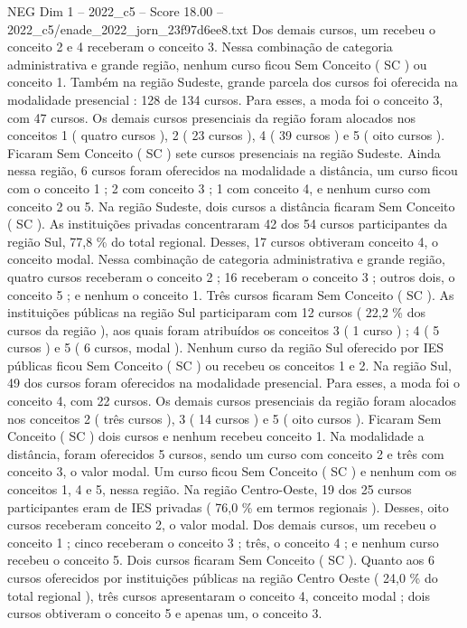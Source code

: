 \begin{textsample}{NEG Dim 1 – 2022\_c5 – Score 18.00 – 2022\_c5/enade\_2022\_jorn\_23f97d6ee8.txt}
Dos demais cursos, um recebeu o conceito 2 e 4 receberam o conceito 3.
Nessa combinação de categoria administrativa e grande região, nenhum curso ficou Sem Conceito ( SC ) ou conceito 1.
Também na região Sudeste, grande parcela dos cursos foi oferecida na modalidade presencial : 128 de 134 cursos.
Para esses, a moda foi o conceito 3, com 47 cursos.
Os demais cursos presenciais da região foram alocados nos conceitos 1 ( quatro cursos ), 2 ( 23 cursos ), 4 ( 39 cursos ) e 5 ( oito cursos ).
Ficaram Sem Conceito ( SC ) sete cursos presenciais na região Sudeste.
Ainda nessa região, 6 cursos foram oferecidos na modalidade a distância, um curso ficou com o conceito 1 ; 2 com conceito 3 ; 1 com conceito 4, e nenhum curso com conceito 2 ou 5.
Na região Sudeste, dois cursos a distância ficaram Sem Conceito ( SC ).
As instituições privadas concentraram 42 dos 54 cursos participantes da região Sul, 77,8 \% do total regional.
Desses, 17 cursos obtiveram conceito 4, o conceito modal.
Nessa combinação de categoria administrativa e grande região, quatro cursos receberam o conceito 2 ; 16 receberam o conceito 3 ; outros dois, o conceito 5 ; e nenhum o conceito 1.
Três cursos ficaram Sem Conceito ( SC ).
As instituições públicas na região Sul participaram com 12 cursos ( 22,2 \% dos cursos da região ), aos quais foram atribuídos os conceitos 3 ( 1 curso ) ; 4 ( 5 cursos ) e 5 ( 6 cursos, modal ).
Nenhum curso da região Sul oferecido por IES públicas ficou Sem Conceito ( SC ) ou recebeu os conceitos 1 e 2.
Na região Sul, 49 dos cursos foram oferecidos na modalidade presencial.
Para esses, a moda foi o conceito 4, com 22 cursos.
Os demais cursos presenciais da região foram alocados nos conceitos 2 ( três cursos ), 3 ( 14 cursos ) e 5 ( oito cursos ).
Ficaram Sem Conceito ( SC ) dois cursos e nenhum recebeu conceito 1.
Na modalidade a distância, foram oferecidos 5 cursos, sendo um curso com conceito 2 e três com conceito 3, o valor modal.
Um curso ficou Sem Conceito ( SC ) e nenhum com os conceitos 1, 4 e 5, nessa região.
Na região Centro-Oeste, 19 dos 25 cursos participantes eram de IES privadas ( 76,0 \% em termos regionais ).
Desses, oito cursos receberam conceito 2, o valor modal.
Dos demais cursos, um recebeu o conceito 1 ; cinco receberam o conceito 3 ; três, o conceito 4 ; e nenhum curso recebeu o conceito 5.
Dois cursos ficaram Sem Conceito ( SC ).
Quanto aos 6 cursos oferecidos por instituições públicas na região Centro Oeste ( 24,0 \% do total regional ), três cursos apresentaram o conceito 4, conceito modal ; dois cursos obtiveram o conceito 5 e apenas um, o conceito 3.

\end{textsample}
